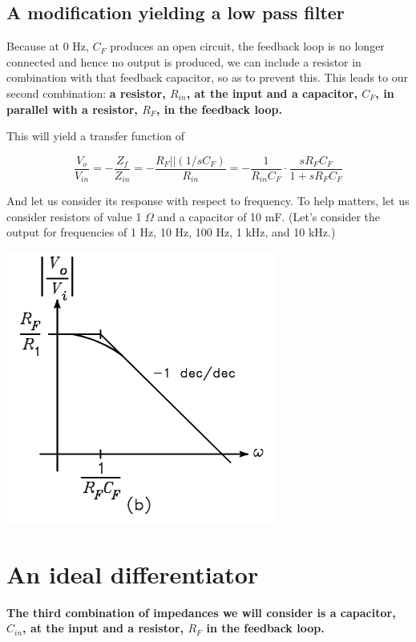 \documentclass[11pt]{book}
\begin{document}
\subsection{A modification yielding a low pass filter}
Because at 0 Hz, $C_F$ produces an open circuit, the feedback loop is no longer connected and hence no output is produced, we can include a resistor in combination with that feedback capacitor, so as to prevent this. This leads to our second combination: \textbf{a resistor, $R_{in}$, at the input and a capacitor, $C_F$, in parallel with a resistor, $R_F$, in the feedback loop.}

This will yield a transfer function of

\begin{equation}
	\frac{V_o}{V_{in}} = -\frac{Z_f}{Z_{in}} = -\frac{R_F \vert \vert (1/sC_F)}{R_{in}} = -\frac{1}{R_{in}C_F}\cdot \frac{sR_F C_F }{1 + sR_F C_F}
\end{equation}

And let us consider its response with respect to frequency. To help matters, let us consider resistors of value 1 $\Omega$ and a capacitor of 10 mF. (Let's consider the output for frequencies of 1 Hz, 10 Hz, 100 Hz, 1 kHz, and 10 kHz.)

\begin{center}\includegraphics{figures/15.02.png}\end{center}
\section{An ideal differentiator}

\textbf{The third combination of impedances we will consider is a capacitor, $C_{in}$, at the input and a resistor, $R_F$ in the feedback loop.}
\end{document}
